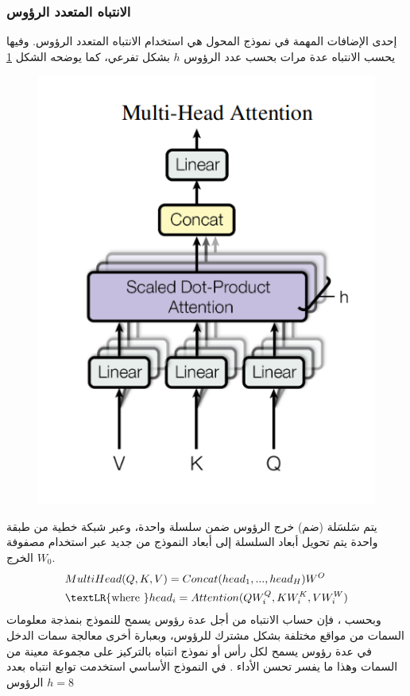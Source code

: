 \subsubsection{ الانتباه المتعدد الرؤوس
}
إحدى الإضافات المهمة في نموذج المحول هي استخدام الانتباه المتعدد الرؤوس. وفيها يحسب الانتباه عدة مرات بحسب عدد الرؤوس
$h$
بشكل تفرعي، كما يوضحه الشكل
\ref{fig:MHA}
\begin{figure}[h!]
	\centerline{\includegraphics[scale=0.4]{images/MHA.png}}
	\caption{
		}
	\label{fig:MHA}
\end{figure}
يتم سَلسَلة (ضم)
 خرج الرؤوس ضمن سلسلة واحدة، وعبر شبكة خطية من طبقة واحدة يتم تحويل أبعاد السلسلة إلى أبعاد النموذج من جديد عبر استخدام مصفوفة  الخرج
$W_0$.
\begin{equation}
\begin{split}
&MultiHead(Q,K,V) = Concat(head_1,...,head_H)W^O\\
&\text{\textLR{where  }} head_i = Attention(QW_i^Q,KW_i^K,VW_i^W)\\
\end{split}
\end{equation}
وبحسب
،
فإن حساب الانتباه من أجل عدة رؤوس يسمح للنموذج بنمذجة معلومات السمات من مواقع مختلفة بشكل مشترك للرؤوس، وبعبارة أخرى معالجة سمات الدخل في عدة رؤوس يسمح لكل رأس أو نموذج انتباه بالتركيز على مجموعة معينة من السمات وهذا ما يفسر تحسن الأداء
.
في النموذج الأساسي
استخدمت توابع انتباه بعدد الرؤوس
$h = 8$
